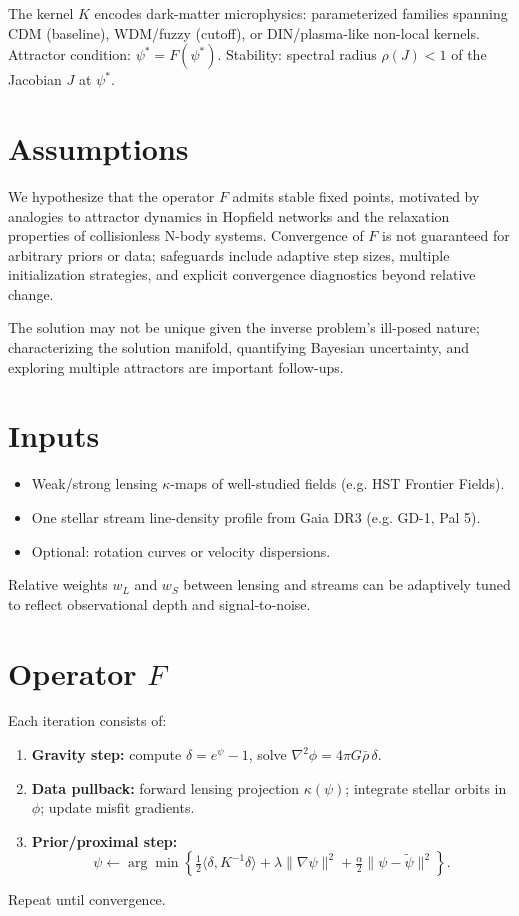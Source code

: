 \documentclass[11pt]{article}
\begin{document}
The kernel $K$ encodes dark-matter microphysics:
parameterized families spanning CDM (baseline), WDM/fuzzy (cutoff), or DIN/plasma-like non-local kernels.
Attractor condition: $\psi^\ast = F(\psi^\ast)$.
Stability: spectral radius $\rho(J)<1$ of the Jacobian $J$ at $\psi^\ast$.

\section{Assumptions}
We hypothesize that the operator $F$ admits stable fixed points, motivated by analogies to attractor dynamics
in Hopfield networks and the relaxation properties of collisionless N-body systems.
Convergence of $F$ is not guaranteed for arbitrary priors or data; safeguards include adaptive step sizes,
multiple initialization strategies, and explicit convergence diagnostics beyond relative change.

The solution may not be unique given the inverse problem’s ill-posed nature; characterizing the solution manifold,
quantifying Bayesian uncertainty, and exploring multiple attractors are important follow-ups.

\section{Inputs}
\begin{itemize}
\item Weak/strong lensing $\kappa$-maps of well-studied fields (e.g. HST Frontier Fields).
\item One stellar stream line-density profile from Gaia DR3 (e.g. GD-1, Pal 5).
\item Optional: rotation curves or velocity dispersions.
\end{itemize}
Relative weights $w_L$ and $w_S$ between lensing and streams can be adaptively tuned to reflect observational
depth and signal-to-noise.

\section{Operator \texorpdfstring{$F$}{F}}
Each iteration consists of:
\begin{enumerate}
\item \textbf{Gravity step:} compute $\delta = e^\psi - 1$, solve $\nabla^2 \phi = 4\pi G \bar{\rho}\, \delta$.
\item \textbf{Data pullback:} forward lensing projection $\kappa(\psi)$; integrate stellar orbits in $\phi$;
   update misfit gradients.
\item \textbf{Prior/proximal step:}
\[
\psi \leftarrow \arg\min \left\{ \tfrac{1}{2}\langle \delta, K^{-1}\delta\rangle
+ \lambda \|\nabla\psi\|^2 + \tfrac{\alpha}{2}\|\psi - \tilde{\psi}\|^2 \right\}.
\]
\end{enumerate}
Repeat until convergence.
\end{document}
